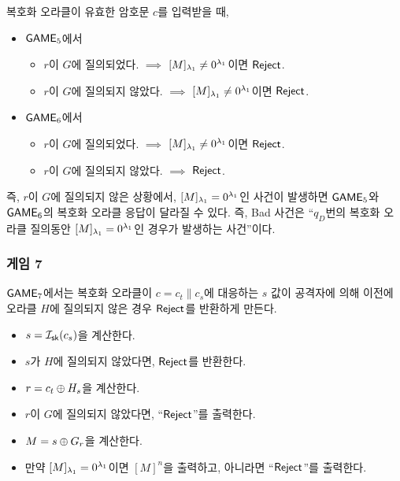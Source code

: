\begin{memo}
	복호화 오라클이 유효한 암호문 $c$를 입력받을 때, 
	\begin{itemize}
		\item $\textsf{GAME}_5$에서
			\begin{itemize}
				\item $r$이 $G$에 질의되었다. $\implies$ $[M]_{\lambda_1} \neq 0^{\lambda_1}$이면 $\textsf{Reject}$.
				\item $r$이 $G$에 질의되지 않았다. $\implies$ $[M]_{\lambda_1} \neq 0^{\lambda_1}$이면 $\textsf{Reject}$.
			\end{itemize}
		\item $\textsf{GAME}_6$에서
		\begin{itemize}
			\item $r$이 $G$에 질의되었다. $\implies$ $[M]_{\lambda_1} \neq 0^{\lambda_1}$이면 $\textsf{Reject}$.
			\item $r$이 $G$에 질의되지 않았다. $\implies$ $\textsf{Reject}$.
		\end{itemize}
	\end{itemize}
	즉, $r$이 $G$에 질의되지 않은 상황에서, $[M]_{\lambda_1} = 0^{\lambda_1}$인 사건이
	발생하면 $\textsf{GAME}_5$와 $\textsf{GAME}_6$의 복호화 오라클 응답이 달라질 수 있다. 즉,
	Bad 사건은 ``$q_D$번의 복호화 오라클 질의동안 $[M]_{\lambda_1} = 0^{\lambda_1}$인
	경우가 발생하는 사건''이다.
\end{memo}

\newpage
\subsubsection{게임 7}

$\textsf{GAME}_7$에서는 복호화 오라클이 $c = c_t \parallel c_s$에 대응하는 $s$ 값이
공격자에 의해 이전에 오라클 $H$에 질의되지 않은 경우 $\textsf{Reject}$를 반환하게
만든다. 

\begin{tcolorbox}
	\begin{itemize}
		\item $s = \mathcal{I}_{\textsf{sk}}(c_s)$을 계산한다.
		\item $s$가 $H$에 질의되지 않았다면, $\textsf{Reject}$를 반환한다.
		\item $r = c_t \oplus H_s$을 계산한다.
		\item $r$이 $G$에 질의되지 않았다면, “$\textsf{Reject}$”를 출력한다.
		\item $M = s \oplus G_r$을 계산한다.
		\item 만약 $[M]_{\lambda_1} = 0^{\lambda_1}$이면 $[M]^{n}$을 출력하고,
		아니라면 “$\textsf{Reject}$”를 출력한다.
	\end{itemize}
\end{tcolorbox}

